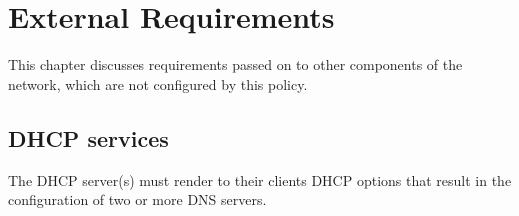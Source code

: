 \chapter{External Requirements}
\label{External_Requirements}

This chapter discusses requirements passed on to other components of the
network, which are not configured by this policy.

\section{DHCP services}

%
The DHCP server(s) must render to their clients DHCP options that result
in the configuration of two or more DNS servers.

